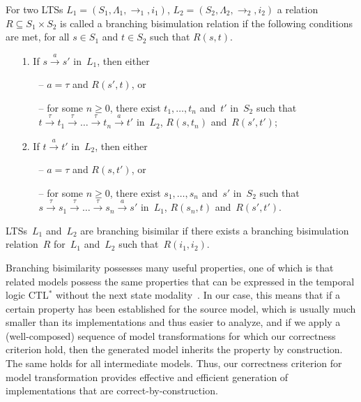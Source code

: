\begin{definition}
 \label{branching_bisimulation}
For two LTSs $L_1 = (S_1, \Lambda_1, \rightarrow_1, i_1)$, $L_2 = (S_2, \Lambda_2, \rightarrow_2, i_2)$ a relation $R \subseteq S_1 \times S_2$ is called a branching bisimulation relation if the following conditions are met, for all $s \in S_1$ and $t \in S_2$ such that $R(s,t)$.
  \begin{itemize}
  \item[1.] If $s \xrightarrow{a} s'$ in~$L_1$, then either
    \begin{itemize}
    \item [--] $a = \tau$ and $R(s',t)$, or
    \item [--] for some $n \geq 0$, there exist $t_1, \ldots, t_n$ and~$t'$ in~$S_2$ such that \\
     $t \xrightarrow{\tau} t_1 \xrightarrow{\tau} \ldots \xrightarrow{\tau} t_{n}
      \xrightarrow{a} t'$ in~$L_2$, $R(s,t_n)$ and~$R(s',t')$;
    \end{itemize}
  \item[2.] If $t \xrightarrow{a} t'$ in~$L_2$, then either
    \begin{itemize}
    \item [--] $a = \tau$ and $R(s,t')$, or
    \item [--] for some $n \geq 0$, there exist $s_1, \ldots, s_n$
      and~$s'$ in~$S_2$ such that \\
      $s \xrightarrow{\tau} s_1
      \xrightarrow{\tau} \ldots \xrightarrow{\tau} s_{n}
      \xrightarrow{a} s'$ in~$L_1$, $R(s_n,t)$ and~$R(s',t')$.
    \end{itemize}
  \end{itemize}
LTSs~$L_1$ and~$L_2$ are branching bisimilar if there exists a branching bisimulation relation~$R$ for~$L_1$ and~$L_2$ such that~$R(i_1,i_2)$.
\end{definition}

Branching bisimilarity possesses many useful properties, one of which is that related models possess the same properties that can be expressed in the temporal logic CTL$^*$ without the next state modality~\cite{DV95}.
In our case, this means that if a certain property has been established for the source model, which is usually much smaller than its implementations and thus easier to analyze, and if we apply a (well-composed) sequence of model transformations for which our correctness criterion hold, then the generated model inherits the property by construction.
The same holds for all intermediate models.
Thus, our correctness criterion for model transformation provides effective and efficient generation of implementations that are correct-by-construction.

